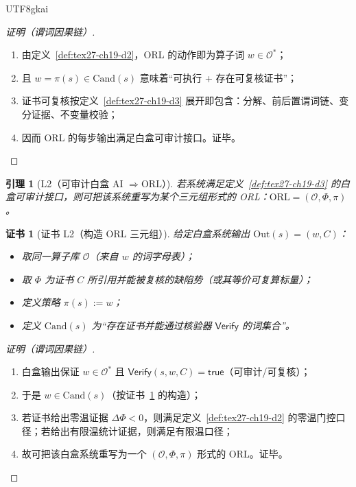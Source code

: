 \documentclass[12pt]{article}
\newtheorem{lemma}{引理}[section]
\newtheorem{Certificate}{证书}[section]
\begin{document}
\begin{CJK*}{UTF8}{gkai}
\begin{proof}[证明（谓词因果链）]
\begin{enumerate}
  \item 由定义~\ref{def:tex27-ch19-d2}，ORL 的动作即为算子词 $w\in\mathcal{O}^{*}$；
  \item 且 $w=\pi(s)\in\mathrm{Cand}(s)$ 意味着“可执行 + 存在可复核证书”；
  \item 证书可复核按定义~\ref{def:tex27-ch19-d3} 展开即包含：分解、前后置谓词链、变分证据、不变量校验；
  \item 因而 ORL 的每步输出满足白盒可审计接口。证毕。
\end{enumerate}
\end{proof}

\begin{lemma}[L2（可审计白盒 AI $\Rightarrow \mathrm{ORL}$）]
\label{lem:tex27-ch19-l2}
若系统满足定义~\ref{def:tex27-ch19-d3} 的白盒可审计接口，则可把该系统重写为某个三元组形式的 ORL：$\mathrm{ORL}=(\mathcal{O},\Phi,\pi)$。
\end{lemma}

\begin{Certificate}[证书 L2（构造 ORL 三元组）]
\label{cert:tex27-ch19-l2}
给定白盒系统输出 $\mathrm{Out}(s)=(w,C)$：
\begin{itemize}
  \item 取同一算子库 $\mathcal{O}$（来自 $w$ 的词字母表）；
  \item 取 $\Phi$ 为证书 $C$ 所引用并能被复核的缺陷势（或其等价可复算标量）；
  \item 定义策略 $\pi(s):=w$；
  \item 定义 $\mathrm{Cand}(s)$ 为“存在证书并能通过核验器 $\mathsf{Verify}$ 的词集合”。
\end{itemize}
\end{Certificate}

\begin{proof}[证明（谓词因果链）]
\begin{enumerate}
  \item 白盒输出保证 $w\in\mathcal{O}^{*}$ 且 $\mathsf{Verify}(s,w,C)=\textsf{true}$（可审计/可复核）；
  \item 于是 $w\in\mathrm{Cand}(s)$（按证书~\ref{cert:tex27-ch19-l2} 的构造）；
  \item 若证书给出零温证据 $\Delta\Phi<0$，则满足定义~\ref{def:tex27-ch19-d2} 的零温门控口径；若给出有限温统计证据，则满足有限温口径；
  \item 故可把该白盒系统重写为一个 $(\mathcal{O},\Phi,\pi)$ 形式的 ORL。证毕。
\end{enumerate}
\end{proof}


\end{CJK*}
\end{document}
